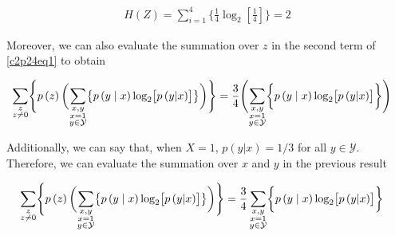 \documentclass[ClusteringConnectionsMAIN.tex]{subfiles}
\begin{document}
\begin{align} \label{c2p24eq2}
H \left( Z \right) = \sum_{i=1}^4 \biggl\{ \frac{1}{4} \log_2 \left[ \frac{1}{4} \right] \biggr\} = 2  \tag{2.24-2}
\end{align}

Moreover, we can also evaluate the summation over $z$ in the second term of \ref{c2p24eq1} to obtain

\begin{align}
\sum_{\substack{z \\ z \neq 0}} \Biggl\{ p \left( z \right) \biggl( \sum_{\substack{x, y \\ x = 1 \\ y \in \mathcal{Y}}} \bigl\{ p \left( y \mid x \right) \log_2 \bigl[ p \left( y | x \right) \bigr] \bigr\} \biggr) \Biggr\} &= \frac{3}{4} \Biggl( \sum_{\substack{x, y \\ x = 1 \\ y \in \mathcal{Y}}} \biggl\{ p \left( y \mid x \right) \log_2 \bigl[ p \left( y | x \right) \bigr] \biggr\} \Biggr) \notag 
\end{align}

Additionally, we can say that, when $X = 1$, $p \left( y | x \right) = 1/3$ for all $y \in \mathcal{Y}$.  Therefore, we can evaluate the summation over $x$ and $y$ in the previous result

\begin{align}
\sum_{\substack{z \\ z \neq 0}} \Biggl\{ p \left( z \right) \biggl( \sum_{\substack{x, y \\ x = 1 \\ y \in \mathcal{Y}}} \bigl\{ p \left( y \mid x \right) \log_2 \bigl[ p \left( y | x \right) \bigr] \bigr\} \biggr) \Biggr\} &= \frac{3}{4} \sum_{\substack{x, y \\ x = 1 \\ y \in \mathcal{Y}}} \biggl\{ p \left( y \mid x \right) \log_2 \bigl[ p \left( y | x \right) \bigr] \biggr\} \notag
\end{align}
\end{document}
